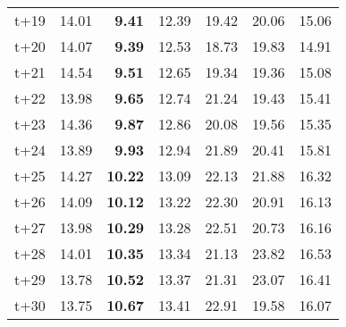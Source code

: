 \begin{table}[H]
\begin{tabular}{lrrrrrr}
t+19  & 14.01  & \textbf{9.41}  & 12.39  & 19.42  & 20.06  & 15.06  \\
t+20  & 14.07  & \textbf{9.39}  & 12.53  & 18.73  & 19.83  & 14.91  \\
t+21  & 14.54  & \textbf{9.51}  & 12.65  & 19.34  & 19.36  & 15.08  \\
t+22  & 13.98  & \textbf{9.65}  & 12.74  & 21.24  & 19.43  & 15.41  \\
t+23  & 14.36  & \textbf{9.87}  & 12.86  & 20.08  & 19.56  & 15.35  \\
t+24  & 13.89  & \textbf{9.93}  & 12.94  & 21.89  & 20.41  & 15.81  \\
t+25  & 14.27  & \textbf{10.22}  & 13.09  & 22.13  & 21.88  & 16.32  \\
t+26  & 14.09  & \textbf{10.12}  & 13.22  & 22.30  & 20.91  & 16.13  \\
t+27  & 13.98  & \textbf{10.29}  & 13.28  & 22.51  & 20.73  & 16.16  \\
t+28  & 14.01  & \textbf{10.35}  & 13.34  & 21.13  & 23.82  & 16.53  \\
t+29  & 13.78  & \textbf{10.52}  & 13.37  & 21.31  & 23.07  & 16.41  \\
t+30  & 13.75  & \textbf{10.67}  & 13.41  & 22.91  & 19.58  & 16.07  \\

\bottomrule
\end{tabular}
\end{table}
